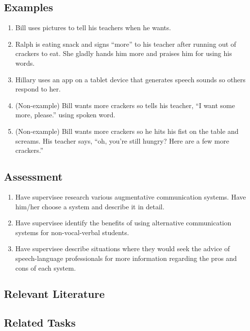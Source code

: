 \subsection{Examples}
\begin{enumerate}
\item Bill uses pictures to tell his teachers when he wants.
\item Ralph is eating snack and signs ``more'' to his teacher after running out of crackers to eat. She gladly hands him more and praises him for using his words.
\item Hillary uses an app on a tablet device that generates speech sounds so others respond to her.
\item (Non-example) Bill wants more crackers so tells his teacher, ``I want some more, please.'' using spoken word.
\item (Non-example) Bill wants more crackers so he hits his fist on the table and screams. His teacher says, ``oh, you're still hungry? Here are a few more crackers.''
\end{enumerate}
%
\subsection{Assessment}
\begin{enumerate}
\item Have supervisee research various augmentative communication systems. Have him/her choose a system and describe it in detail.
\item Have supervisee identify the benefits of using alternative communication systems for non-vocal-verbal students.
\item Have supervisee describe situations where they would seek the advice of speech-language professionals for more information regarding the pros and cons of each system.
\end{enumerate}
%
\subsection{Relevant Literature}
\begin{refsection}
\nocite{am2002aug,
        charlop2002using,
        dattilo1991facilitating,
        jacobson1995history,
        durand1999functional,
        mirenda1990communication}
\printbibliography[heading=none]
\end{refsection}

%
\subsection{Related Tasks}
\fourdThree{}\\
\fourdFour{}\\
\fourdFive{}\\
\fourfSeven{}\\
%
\clearpage \section[\fourjTen{}]{\fourjTen{}%
              }
